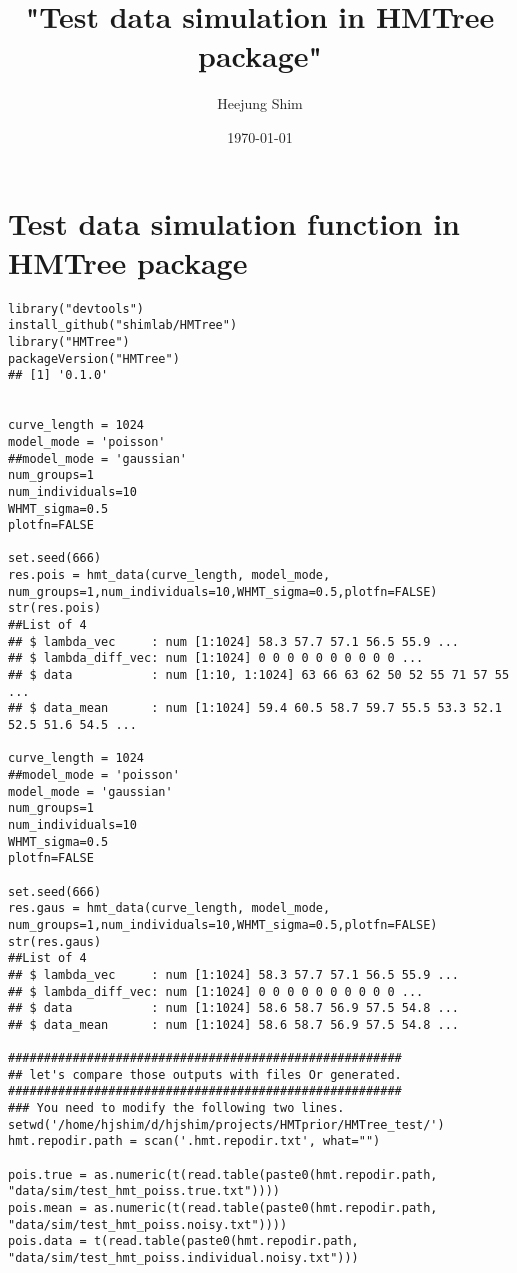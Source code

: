 \documentclass[11pt]{article}
\author{Heejung Shim}
\date{\today}
\title{"Test data simulation in HMTree package"}
\begin{document}
\maketitle
\tableofcontents


\section{Test data simulation function in HMTree package}
\label{sec-1}
\begin{lstlisting}
library("devtools")
install_github("shimlab/HMTree")
library("HMTree")
packageVersion("HMTree")
## [1] '0.1.0'


curve_length = 1024
model_mode = 'poisson' 
##model_mode = 'gaussian' 
num_groups=1
num_individuals=10
WHMT_sigma=0.5
plotfn=FALSE
 
set.seed(666) 
res.pois = hmt_data(curve_length, model_mode, num_groups=1,num_individuals=10,WHMT_sigma=0.5,plotfn=FALSE)
str(res.pois)
##List of 4
## $ lambda_vec     : num [1:1024] 58.3 57.7 57.1 56.5 55.9 ...
## $ lambda_diff_vec: num [1:1024] 0 0 0 0 0 0 0 0 0 0 ...
## $ data           : num [1:10, 1:1024] 63 66 63 62 50 52 55 71 57 55 ...
## $ data_mean      : num [1:1024] 59.4 60.5 58.7 59.7 55.5 53.3 52.1 52.5 51.6 54.5 ...

curve_length = 1024
##model_mode = 'poisson' 
model_mode = 'gaussian' 
num_groups=1
num_individuals=10
WHMT_sigma=0.5
plotfn=FALSE
 
set.seed(666) 
res.gaus = hmt_data(curve_length, model_mode, num_groups=1,num_individuals=10,WHMT_sigma=0.5,plotfn=FALSE)
str(res.gaus)
##List of 4
## $ lambda_vec     : num [1:1024] 58.3 57.7 57.1 56.5 55.9 ...
## $ lambda_diff_vec: num [1:1024] 0 0 0 0 0 0 0 0 0 0 ...
## $ data           : num [1:1024] 58.6 58.7 56.9 57.5 54.8 ...
## $ data_mean      : num [1:1024] 58.6 58.7 56.9 57.5 54.8 ...

#######################################################
## let's compare those outputs with files Or generated.
#######################################################
### You need to modify the following two lines.
setwd('/home/hjshim/d/hjshim/projects/HMTprior/HMTree_test/')
hmt.repodir.path = scan('.hmt.repodir.txt', what="")

pois.true = as.numeric(t(read.table(paste0(hmt.repodir.path, "data/sim/test_hmt_poiss.true.txt"))))
pois.mean = as.numeric(t(read.table(paste0(hmt.repodir.path, "data/sim/test_hmt_poiss.noisy.txt"))))
pois.data = t(read.table(paste0(hmt.repodir.path, "data/sim/test_hmt_poiss.individual.noisy.txt")))


\end{lstlisting}
\end{document}
